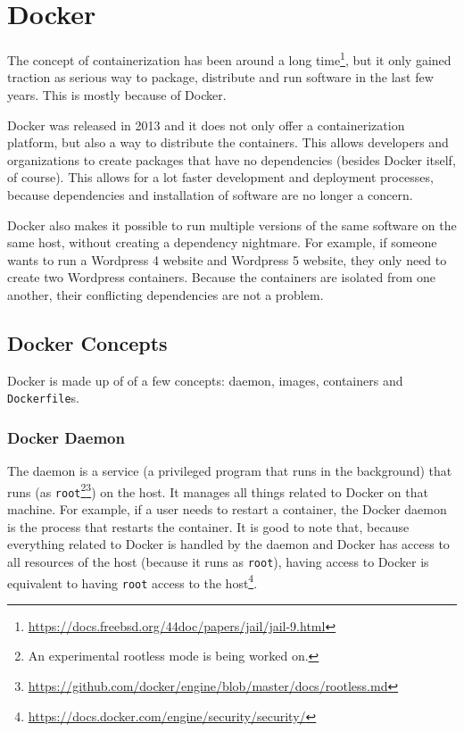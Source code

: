 \section{Docker}
The concept of containerization has been around a long time\footnote{\url{https://docs.freebsd.org/44doc/papers/jail/jail-9.html}}, but it only gained traction as serious way to package, distribute and run software in the last few years. This is mostly because of Docker.

\hfill

Docker was released in 2013 and it does not only offer a containerization platform, but also a way to distribute the containers. This allows developers and organizations to create packages that have no dependencies (besides Docker itself, of course). This allows for a lot faster development and deployment processes, because dependencies and installation of software are no longer a concern.

\hfill

Docker also makes it possible to run multiple versions of the same software on the same host, without creating a dependency nightmare. For example, if someone wants to run a Wordpress 4 website and Wordpress 5 website, they only need to create two Wordpress containers. Because the containers are isolated from one another, their conflicting dependencies are not a problem.

\subsection{Docker Concepts}
Docker is made up of of a few concepts: daemon, images, containers and \lstinline{Dockerfile}s.

\subsubsection{Docker Daemon}
The daemon is a service (a privileged program that runs in the background) that runs (as \lstinline{root}\footnote{An experimental rootless mode is being worked on.}\footnote{\url{https://github.com/docker/engine/blob/master/docs/rootless.md}}) on the host. It manages all things related to Docker on that machine. For example, if a user needs to restart a container, the Docker daemon is the process that restarts the container. It is good to note that, because everything related to Docker is handled by the daemon and Docker has access to all resources of the host (because it runs as \lstinline{root}), having access to Docker is equivalent to having \lstinline{root} access to the host\footnote{\url{https://docs.docker.com/engine/security/security/}}.


